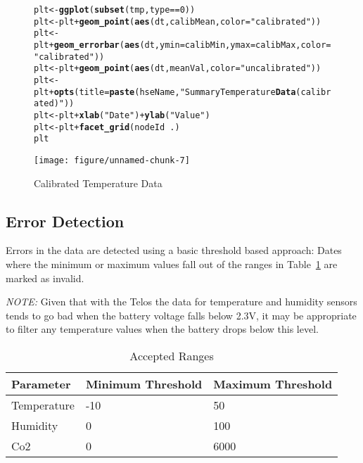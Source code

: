 \documentclass[10pt,a4paper]{article}\usepackage{graphicx, color}
\makeatletter
\def\maxwidth{ %
  \ifdim\Gin@nat@width>\linewidth
    \linewidth
  \else
    \Gin@nat@width
  \fi
}
\newcommand{\hlfunctioncall}[1]{\textcolor[rgb]{0.501960784313725,0,0.329411764705882}{\textbf{#1}}}%
\newcommand{\hlstring}[1]{\textcolor[rgb]{0.6,0.6,1}{#1}}%
\newenvironment{kframe}{%
 \def\at@end@of@kframe{}%
 \ifinner\ifhmode%
  \def\at@end@of@kframe{\end{minipage}}%
  \begin{minipage}{\columnwidth}%
 \fi\fi%
 \def\FrameCommand##1{\hskip\@totalleftmargin \hskip-\fboxsep
 \colorbox{shadecolor}{##1}\hskip-\fboxsep
     \hskip-\linewidth \hskip-\@totalleftmargin \hskip\columnwidth}%
 \MakeFramed {\advance\hsize-\width
   \@totalleftmargin\z@ \linewidth\hsize
   \@setminipage}}%
 {\par\unskip\endMakeFramed%
 \at@end@of@kframe}
\newenvironment{knitrout}{}{} %
\makeatother
\begin{document}
\begin{figure}[ht]
\begin{knitrout}
\color{fgcolor}\begin{kframe}
\begin{alltt}
plt <- \hlfunctioncall{ggplot}(\hlfunctioncall{subset}(tmp, type == 0))
plt <- plt + \hlfunctioncall{geom_point}(\hlfunctioncall{aes}(dt, calibMean, color = \hlstring{"calibrated"}))
plt <- plt + \hlfunctioncall{geom_errorbar}(\hlfunctioncall{aes}(dt, ymin = calibMin, ymax = calibMax, color = \hlstring{"calibrated"}))
plt <- plt + \hlfunctioncall{geom_point}(\hlfunctioncall{aes}(dt, meanVal, color = \hlstring{"uncalibrated"}))
plt <- plt + \hlfunctioncall{opts}(title = \hlfunctioncall{paste}(hseName, \hlstring{"Summary Temperature \hlfunctioncall{Data} (calibrated)"}))
plt <- plt + \hlfunctioncall{xlab}(\hlstring{"Date"}) + \hlfunctioncall{ylab}(\hlstring{"Value"})
plt <- plt + \hlfunctioncall{facet_grid}(nodeId ~ .)
plt
\end{alltt}
\end{kframe}
\texttt{[image: figure/unnamed-chunk-7]} 

\end{knitrout}

\caption{Calibrated Temperature Data}
\label{fig:calibData}
\end{figure}

\subsection{Error Detection}
Errors in the data are detected using a basic threshold based approach: Dates
where the minimum or maximum values fall out of the ranges in
Table~\ref{tab:accepted-Range} are marked as invalid.

\emph{NOTE:} Given that with the Telos the data for temperature and humidity
sensors tends to go bad when the battery voltage falls below 2.3V,  it may be
appropriate to filter any temperature values when the battery drops below this level.

\begin{table}[htbp]
\begin{tabular}{l l l}
  Parameter & Minimum Threshold & Maximum Threshold \\
  \hline
  Temperature & -10 & 50 \\
  Humidity & 0 & 100 \\
  Co2 & 0 & 6000
\end{tabular}
\caption{Accepted Ranges}
\label{tab:accepted-Range}
\end{table}
\end{document}
